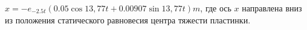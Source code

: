 $x=-e_{-2.5t}(0.05\cos13,77t+0.00907\sin13,77t) m$, где ось $x$
направлена вниз из положения статического равновесия центра тяжести пластинки.
